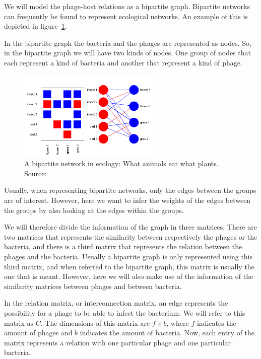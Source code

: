 \documentclass{article}
\begin{document}
We will model the phage-host relations as a bipartite graph. 
Bipartite networks can frequently be found to represent 
ecological networks. An example of this is depicted in figure~\ref{fig:networkecology}.

In the bipartite graph the bacteria and the phages are represented as nodes.
So, in the bipartite graph we will have two kinds of nodes. One group 
of nodes that each represent a kind of bacteria and another that represent
a kind of phage.


\begin{figure}[ht]
    \centering
    \includegraphics[width=0.6\textwidth]{img/bipartite_class_01.png}
    \caption{A bipartite network in ecology: What animals eat what plants. Source:~\cite{flores2016bimat}}\label{fig:networkecology}
\end{figure}

Usually, when representing bipartite networks, only the edges between the groups
are of interest. However, here we want to infer the weights of the edges
between the groups by also 
looking at the edges within the groups.

We will therefore divide the information of the graph in three matrices. 
There are two matrices that represents the similarity between respectively
the phages or the bacteria, and there is a third matrix that represents the
relation between the phages and the bacteria. Usually a bipartite graph is
only represented using this third matrix, and when referred to the bipartite graph,
this matrix is usually the one that is meant. However, here we will also make use 
of the information of the similarity matrices between phages and between bacteria.

In the relation matrix, or interconnection matrix, 
an edge represents the possibility for a phage to be able to infect the bacterium. 
We will refer to this matrix as $C$. The dimensions of this matrix are
$f \times b$, where $f$ indicates the amount of phages and $b$ indicates the amount
of bacteria. Now, each entry of the matrix represents a relation with one particular
phage and one particular bacteria. 
\end{document}
